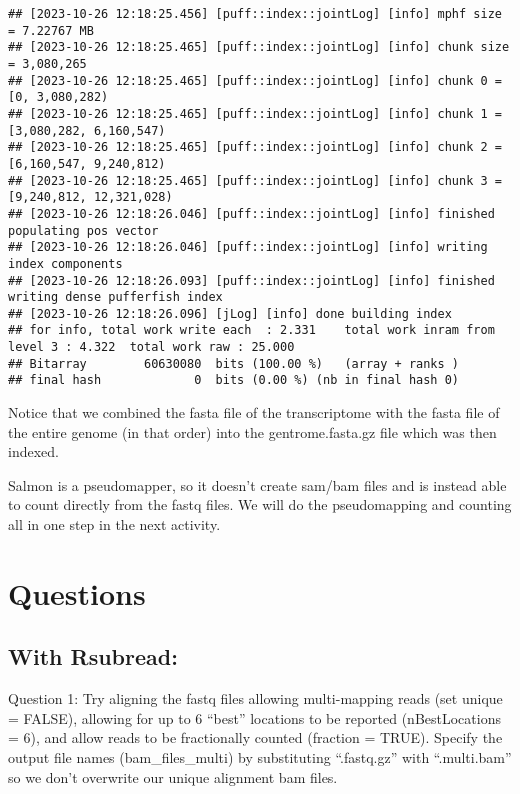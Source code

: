 \documentclass[
]{book}
\begin{document}
\begin{verbatim}
## [2023-10-26 12:18:25.456] [puff::index::jointLog] [info] mphf size = 7.22767 MB
## [2023-10-26 12:18:25.465] [puff::index::jointLog] [info] chunk size = 3,080,265
## [2023-10-26 12:18:25.465] [puff::index::jointLog] [info] chunk 0 = [0, 3,080,282)
## [2023-10-26 12:18:25.465] [puff::index::jointLog] [info] chunk 1 = [3,080,282, 6,160,547)
## [2023-10-26 12:18:25.465] [puff::index::jointLog] [info] chunk 2 = [6,160,547, 9,240,812)
## [2023-10-26 12:18:25.465] [puff::index::jointLog] [info] chunk 3 = [9,240,812, 12,321,028)
## [2023-10-26 12:18:26.046] [puff::index::jointLog] [info] finished populating pos vector
## [2023-10-26 12:18:26.046] [puff::index::jointLog] [info] writing index components
## [2023-10-26 12:18:26.093] [puff::index::jointLog] [info] finished writing dense pufferfish index
## [2023-10-26 12:18:26.096] [jLog] [info] done building index
## for info, total work write each  : 2.331    total work inram from level 3 : 4.322  total work raw : 25.000 
## Bitarray        60630080  bits (100.00 %)   (array + ranks )
## final hash             0  bits (0.00 %) (nb in final hash 0)
\end{verbatim}

Notice that we combined the fasta file of the transcriptome with the fasta file of the entire genome (in that order) into the gentrome.fasta.gz file which was then indexed.

Salmon is a pseudomapper, so it doesn't create sam/bam files and is instead able to count directly from the fastq files. We will do the pseudomapping and counting all in one step in the next activity.

\hypertarget{questions-1}{%
\section{Questions}\label{questions-1}}

\hypertarget{with-rsubread}{%
\subsection{With Rsubread:}\label{with-rsubread}}

Question 1: Try aligning the fastq files allowing multi-mapping reads (set unique = FALSE), allowing for up to 6 ``best'' locations to be reported (nBestLocations = 6), and allow reads to be fractionally counted (fraction = TRUE). Specify the output file names (bam\_files\_multi) by substituting ``.fastq.gz'' with ``.multi.bam'' so we don't overwrite our unique alignment bam files.
\end{document}
